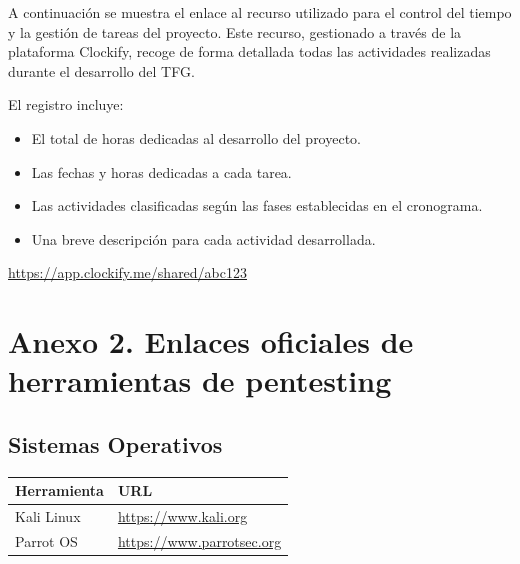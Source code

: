 \documentclass[a4paper, 11pt]{article}
\begin{document}
\label{anexo:1}

A continuación se muestra el enlace al recurso utilizado para el control del tiempo y la gestión de tareas del proyecto. Este recurso, gestionado a través de la plataforma Clockify, recoge de forma detallada todas las actividades realizadas durante el desarrollo del TFG. 

El registro incluye:
\begin{itemize}
  \item El total de horas dedicadas al desarrollo del proyecto.
  \item Las fechas y horas dedicadas a cada tarea.
  \item Las actividades clasificadas según las fases establecidas en el cronograma.
  \item Una breve descripción para cada actividad desarrollada.
\end{itemize}

\begin{tcolorbox}[enhanced,attach boxed title to top center={yshift=-3mm,yshifttext=-1mm},
  colback=blue!5!white,colframe=blue!75!black,colbacktitle=red!80!black,
  title=Dirección URL,fonttitle=\bfseries,
  boxed title style={size=small,colframe=red!50!black} ]
  \centering
  \url{https://app.clockify.me/shared/abc123}

\end{tcolorbox}


\clearpage

\thispagestyle{nohead}


\section*{Anexo 2. Enlaces oficiales de herramientas de pentesting}
\label{anexo:2}

\subsection*{Sistemas Operativos}
\begin{table}[H]
\centering
\begin{tabular}{|m{5cm}|m{10cm}|}
\hline
\textbf{Herramienta} & \textbf{URL} \\
\hline
Kali Linux & \url{https://www.kali.org} \\
\hline
Parrot OS & \url{https://www.parrotsec.org} \\
\hline
\end{tabular}
\end{table}
\end{document}
